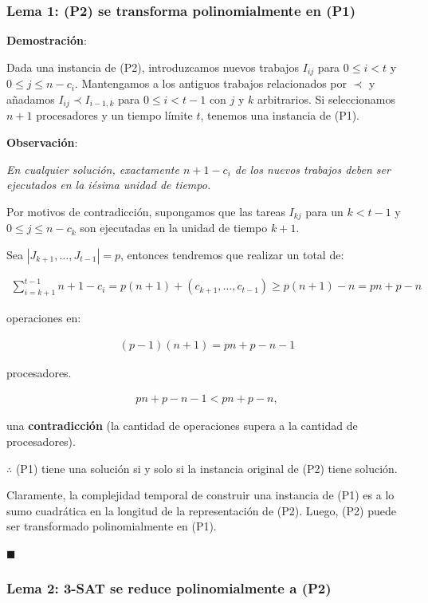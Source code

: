 \documentclass[14pt]{extarticle}
\begin{document}
\subsubsection*{Lema 1: (P2) se transforma polinomialmente en (P1)}

\textbf{Demostración}:

Dada una instancia de (P2), introduzcamos nuevos trabajos $I_{ij}$ para $0 \leq i < t$ y $0 \leq j \leq n - c_i$. Mantengamos a los antiguos trabajos relacionados por $\prec$ y añadamos $I_{ij} \prec I_{i-1, k}$ para $0 \leq i < t - 1$ con $j$ y $k$ arbitrarios. Si seleccionamos $n + 1$ procesadores y un tiempo límite $t$, tenemos una instancia de (P1).

\textbf{Observación}:

\textit{En cualquier solución, exactamente $n + 1 - c_i$ de los nuevos trabajos deben ser ejecutados en la iésima unidad de tiempo.}

Por motivos de contradicción, supongamos que las tareas $I_{kj}$ para un $k < t - 1$ y $0 \leq j \leq n - c_k$ son ejecutadas en la unidad de tiempo $k + 1$.

Sea $|{J_{k+1}, \ldots, J_{t-1}}| = p$, entonces tendremos que realizar un total de:

\begin{align*}
\sum_{i = k + 1}^{t - 1} n + 1 - c_i = p (n + 1) + (c_{k+1}, \ldots, c_{t-1}) \geq p(n + 1) - n = pn + p - n
\end{align*}

operaciones en:

\begin{align*}
(p - 1)(n + 1) = pn + p - n - 1
\end{align*}

procesadores.

\begin{align*}
pn + p - n - 1 < pn + p - n,
\end{align*}

una \textbf{contradicción} (la cantidad de operaciones supera a la cantidad de procesadores).

$\therefore$ (P1) tiene una solución si y solo si la instancia original de (P2) tiene solución.

Claramente, la complejidad temporal de construir una instancia de (P1) es a lo sumo cuadrática en la longitud de la representación de (P2). Luego, (P2) puede ser transformado polinomialmente en (P1).

$\blacksquare$

\subsubsection*{Lema 2: 3-SAT se reduce polinomialmente a (P2)}
\end{document}
